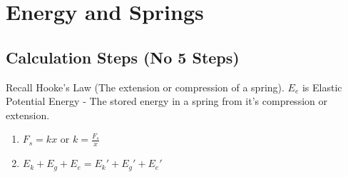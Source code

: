 \documentclass{article}
\begin{document}
\section{Energy and Springs}
\begin{adjustwidth}{1cm}{0pt}
    \subsection*{Calculation Steps (No 5 Steps)}
    \begin{flushleft}
        Recall Hooke's Law (The extension or compression of a spring). $E_{e}$ is Elastic Potential Energy - The stored energy in a spring from it's compression or extension.
    \end{flushleft}
    \vspace*{5pt}
    \begin{adjustwidth}{0.5cm}{0pt}
        \begin{enumerate}
            \item $F_{s} = kx$ or $k = \frac{F_{s}}{x}$
            \item $E_{k} + E_{g} + E_{e} = E_{k}\prime + E_{g}\prime + E_{e}\prime$
        \end{enumerate}
    \end{adjustwidth}
\end{adjustwidth}
\end{document}
